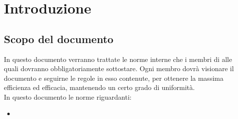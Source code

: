 \newpage
\section{Introduzione}

\subsection{Scopo del documento}
In questo documento verranno trattate le norme interne che i membri di \gruppo alle quali dovranno obbligatoriamente sottostare. Ogni membro dovrà visionare il documento e seguirne le regole in esso contenute, per ottenere la massima efficienza ed efficacia, mantenendo un certo grado di uniformità.
\\In questo documento le norme riguardanti:
\begin{itemize}
	\item 
\end{itemize}
	